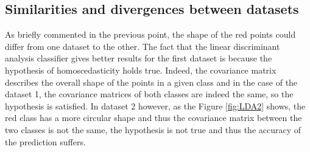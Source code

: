 \documentclass[12pt]{article}
\begin{document}
\subsection{Similarities and divergences between datasets}
As briefly commented in the previous point, the shape of the red points could differ from one dataset to the other. 
The fact that the linear discriminant analysis classifier gives better results for the first dataset is because the hypothesis of homoscedasticity holds true. Indeed, the covariance matrix describes the overall shape of the points in a given class and in the case of the dataset 1, the covariance matrices of both classes are indeed the same, so the hypothesis is satisfied. In dataset 2 however, as the Figure \ref{fig:LDA2} shows, the red class has a more circular shape and thus the covariance matrix between the two classes is not the same, the hypothesis is not true and thus the accuracy of the prediction suffers.
\end{document}
